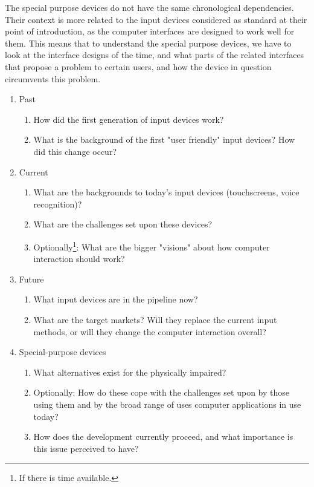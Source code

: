 \documentclass[a4paper,10pt]{article}
\begin{document}
The special purpose devices do not have the same chronological dependencies. Their context is more related to the input devices considered as standard at their point of introduction, as the computer interfaces are designed to work well for them. This means that to understand the special purpose devices, we have to look at the interface designs of the time, and what parts of the related interfaces that propose a problem to certain users, and how the device in question circumvents this problem.

\begin{enumerate}
	\item
	Past
	\begin{enumerate}[I]
		\item How did the first generation of input devices work?
		\item What is the background of the first "user friendly" input devices? How did this change occur?
	\end{enumerate}

	\item
	Current
	\begin{enumerate}[I]
		\item What are the backgrounds to today’s input devices (touchscreens, voice recognition)?
		\item What are the challenges set upon these devices?
		\item Optionally\footnote{If there is time available.}: What are the bigger "visions" about how computer interaction should work?
	\end{enumerate}

	\item
	Future
	\begin{enumerate}[I]
		\item What input devices are in the pipeline now?
		\item What are the target markets? Will they replace the current input methods, or will they change the computer 	interaction overall?
	\end{enumerate}

	\item
	Special-purpose devices
	\begin{enumerate}[I]
		\item
		What alternatives exist for the physically impaired?
		\item
		Optionally: How do these cope with the challenges set upon by those using them and by the broad range of uses computer applications in use today?
		\item
		How does the development currently proceed, and what importance is this issue perceived to have?
	\end{enumerate}
\end{enumerate}
\end{document}
